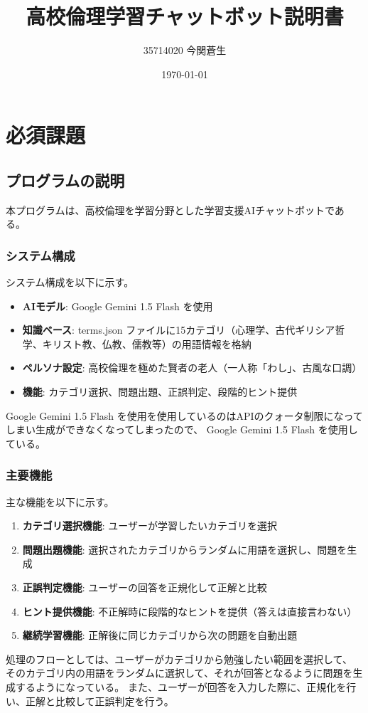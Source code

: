 \documentclass[a4paper,11pt]{ltjsarticle}
\title{高校倫理学習チャットボット説明書}
\author{35714020 今関蒼生}
\date{\today}
\begin{document}
\maketitle
%
%
\section{必須課題}
\subsection{プログラムの説明}
本プログラムは、高校倫理を学習分野とした学習支援AIチャットボットである。

\subsubsection{システム構成}
システム構成を以下に示す。

\begin{itemize}
\item \textbf{AIモデル}: Google Gemini 1.5 Flash を使用
\item \textbf{知識ベース}: terms.json ファイルに15カテゴリ（心理学、古代ギリシア哲学、キリスト教、仏教、儒教等）の用語情報を格納
\item \textbf{ペルソナ設定}: 高校倫理を極めた賢者の老人（一人称「わし」、古風な口調）
\item \textbf{機能}: カテゴリ選択、問題出題、正誤判定、段階的ヒント提供
\end{itemize}
Google Gemini 1.5 Flash を使用を使用しているのはAPIのクォータ制限になってしまい生成ができなくなってしまったので、
Google Gemini 1.5 Flash を使用している。

\subsubsection{主要機能}
主な機能を以下に示す。
\begin{enumerate}
\item \textbf{カテゴリ選択機能}: ユーザーが学習したいカテゴリを選択
\item \textbf{問題出題機能}: 選択されたカテゴリからランダムに用語を選択し、問題を生成
\item \textbf{正誤判定機能}: ユーザーの回答を正規化して正解と比較
\item \textbf{ヒント提供機能}: 不正解時に段階的なヒントを提供（答えは直接言わない）
\item \textbf{継続学習機能}: 正解後に同じカテゴリから次の問題を自動出題
\end{enumerate}
処理のフローとしては、ユーザーがカテゴリから勉強したい範囲を選択して、
そのカテゴリ内の用語をランダムに選択して、それが回答となるように問題を生成するようになっている。
また、ユーザーが回答を入力した際に、正規化を行い、正解と比較して正誤判定を行う。
\end{document}
